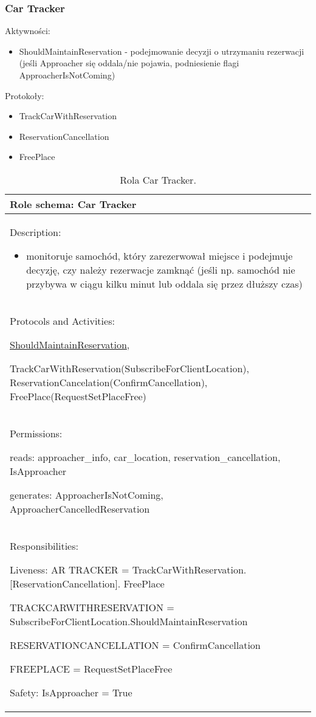 \newpage
\subsubsection{Car Tracker}

Aktywności:
\begin{itemize}
    \item ShouldMaintainReservation - podejmowanie decyzji o utrzymaniu rezerwacji (jeśli Approacher się oddala/nie pojawia, podniesienie flagi ApproacherIsNotComing)
\end{itemize}

Protokoły:
\begin{itemize}
    \item TrackCarWithReservation 
    \item ReservationCancellation
    \item FreePlace 
\end{itemize}


\begin{table}[!h] \label{tab:rola1} \centering
    \caption{Rola Car Tracker.}
    \begin{tabular} {| p{14cm} |} \hline
        Role schema: Car Tracker \\ \hline
        Description:

        \begin{itemize}
            \item monitoruje samochód, który zarezerwował miejsce i podejmuje decyzję, czy należy rezerwacje zamknąć (jeśli np. samochód nie przybywa w ciągu kilku minut lub oddala się przez dłuższy czas)
        \end{itemize} \\ \hline
        Protocols and Activities: 
        
        \ul{ShouldMaintainReservation}, 
        
        TrackCarWithReservation(SubscribeForClientLocation), ReservationCancelation(ConfirmCancellation), FreePlace(RequestSetPlaceFree) \\ \hline
        Permissions:

        reads: approacher\_info, car\_location,  reservation\_cancellation, IsApproacher

        generates:  ApproacherIsNotComing, ApproacherCancelledReservation                                                                                   \\ \hline
        Responsibilities:

        Liveness: AR TRACKER = TrackCarWithReservation.[ReservationCancellation]. FreePlace

        TRACKCARWITHRESERVATION = SubscribeForClientLocation.ShouldMaintainReservation

        RESERVATIONCANCELLATION = ConfirmCancellation

        FREEPLACE = RequestSetPlaceFree        

        Safety: IsApproacher = True \\ \hline
    \end{tabular}
\end{table}

